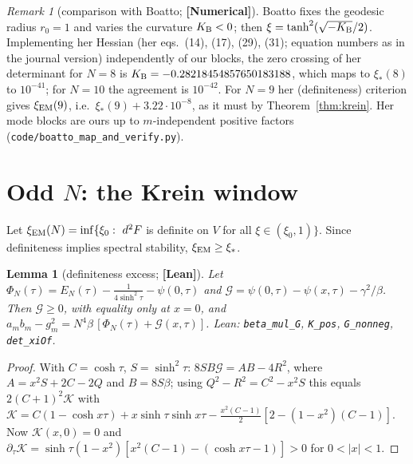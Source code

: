 \documentclass[11pt]{article}
\newtheorem{lemma}[theorem]{Lemma}
\theoremstyle{definition}
\theoremstyle{remark}
\newtheorem{remark}[theorem]{Remark}
\newcommand{\st}[1]{\textbf{[#1]}}
\newcommand{\lean}[1]{\nolinkurl{#1}}
\begin{document}
\begin{remark}[comparison with Boatto; \st{Numerical}]\label{rem:boatto}
Boatto \cite{Boatto2008} fixes the geodesic radius $r_0=1$ and varies the curvature $K_{\rm B}<0$; then
$\xi=\tanh^2(\sqrt{-K_{\rm B}}/2)$. Implementing her Hessian (her eqs.~(14), (17), (29), (31); equation numbers as in the journal
version) independently of our blocks, the zero crossing of her determinant for $N=8$ is $K_{\rm B}=-0.28218454857650183188$, which maps to $\xi_*(8)$ to $10^{-41}$; for $N=10$ the agreement is $10^{-42}$.
For $N=9$ her (definiteness) criterion gives $\xi_{\rm EM}(9)$, i.e.\ $\xi_*(9)+3.22\cdot10^{-8}$, as it must by
Theorem~\ref{thm:krein}. Her mode blocks are ours up to $m$-independent positive factors
(\nolinkurl{code/boatto_map_and_verify.py}).
\end{remark}

\section{\texorpdfstring{Odd $N$}{Odd N}: the Krein window}\label{sec:krein}

Let $\xi_{\rm EM}(N)=\inf\{\xi_0:\ d^2F$ is definite on $V$ for all $\xi\in(\xi_0,1)\}$. Since definiteness implies spectral
stability, $\xi_{\rm EM}\ge\xi_*$.

\begin{lemma}[definiteness excess; \st{Lean}]\label{lem:em}
Let $\Phi_N(\tau)=E_N(\tau)-\frac1{4\sinh^2\tau}-\psi(0,\tau)$ and $\mathcal G=\psi(0,\tau)-\psi(x,\tau)-\gamma^2/\beta$. Then
$\mathcal G\ge0$, with equality only at $x=0$, and $a_mb_m-g_m^2=N^4\beta\,[\Phi_N(\tau)+\mathcal G(x,\tau)]$.
Lean: \lean{beta_mul_G}, \lean{K_pos}, \lean{G_nonneg}, \lean{det_xiOf}.
\end{lemma}
\begin{proof}
With $C=\cosh\tau$, $S=\sinh^2\tau$: $8SB\mathcal G=AB-4R^2$, where $A=x^2S+2C-2Q$ and $B=8S\beta$; using $Q^2-R^2=C^2-x^2S$ this
equals $2(C+1)^2\mathcal K$ with
$\mathcal K=C(1-\cosh x\tau)+x\sinh\tau\sinh x\tau-\frac{x^2(C-1)}2[2-(1-x^2)(C-1)]$. Now $\mathcal K(x,0)=0$ and
$\partial_\tau\mathcal K=\sinh\tau(1-x^2)[x^2(C-1)-(\cosh x\tau-1)]>0$ for $0<|x|<1$.
\end{proof}
\end{document}
